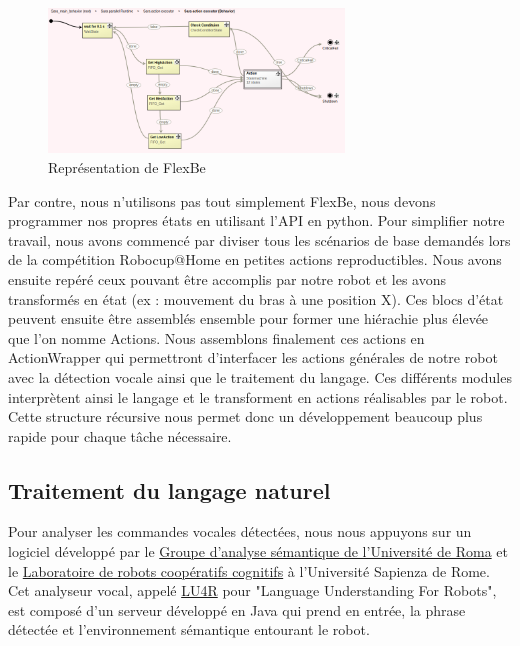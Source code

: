 \documentclass[runningheads,a4paper]{llncs}
\begin{document}
\begin{figure}[h!]
	\centering
	\includegraphics[width=0.70\textwidth]{images/flexbe.png}
	\caption{Représentation de FlexBe}
\end{figure}

Par contre, nous n'utilisons pas tout simplement FlexBe, nous devons programmer nos propres états en utilisant l'API en python. Pour simplifier notre travail, nous avons commencé par diviser tous les scénarios de base demandés lors de la compétition Robocup@Home en petites actions reproductibles. Nous avons ensuite repéré ceux pouvant être accomplis par notre robot et les avons transformés en état (ex : mouvement du bras à une position X). Ces blocs d'état peuvent ensuite être assemblés ensemble pour former une hiérachie plus élevée que l'on nomme Actions. Nous assemblons finalement ces actions en ActionWrapper qui permettront d'interfacer les actions générales de notre robot avec la détection vocale ainsi que le traitement du langage. Ces différents modules interprètent ainsi le langage et le transforment en actions réalisables par le robot. Cette structure récursive nous permet donc un développement beaucoup plus rapide pour chaque tâche nécessaire. \\

\subsection{Traitement du langage naturel}

Pour analyser les commandes vocales détectées, nous nous appuyons sur un logiciel développé par le \href{http://sag.art.uniroma2.it/}{Groupe d'analyse sémantique de l'Université de Roma} et le \href{http://labrococo.dis.uniroma1.it /}{Laboratoire de robots coopératifs cognitifs} à l'Université Sapienza de Rome. Cet analyseur vocal, appelé \href{http://sag.art.uniroma2.it/lu4r.html}{LU4R} \cite{lu4r} pour "Language Understanding For Robots", est composé d'un serveur développé en Java qui prend en entrée, la phrase détectée et l'environnement sémantique entourant le robot. \\
\end{document}
